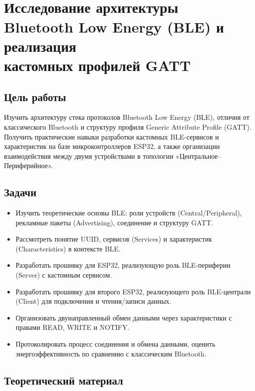 \section[Исследование архитектуры Bluetooth Low Energy (BLE) и реализация кастомных профилей GATT]
{\\Исследование архитектуры Bluetooth Low Energy (BLE) и реализация \\ кастомных профилей GATT}


\subsection{Цель работы}
Изучить архитектуру стека протоколов Bluetooth Low Energy (BLE), отличия от классического Bluetooth и структуру профиля Generic Attribute Profile (GATT). Получить практические навыки разработки кастомных BLE-сервисов и характеристик на базе микроконтроллеров ESP32, а также организации взаимодействия между двумя устройствами в топологии «Центральное–Периферийное».

\subsection{Задачи}
\begin{itemize}[nosep]
    \item Изучить теоретические основы BLE: роли устройств (Central/Peripheral), рекламные пакеты (Advertising), соединение и структуру GATT.
    \item Рассмотреть понятие UUID, сервисов (Services) и характеристик (Characteristics) в контексте BLE.
    \item Разработать прошивку для ESP32, реализующую роль BLE-периферии (Server) с кастомным сервисом.
    \item Разработать прошивку для второго ESP32, реализующего роль BLE-централи (Client) для подключения и чтения/записи данных.
    \item Организовать двунаправленный обмен данными через характеристики с правами READ, WRITE и NOTIFY.
    \item Протоколировать процесс соединения и обмена данными, оценить энергоэффективность по сравнению с классическим Bluetooth.
\end{itemize}

\subsection{Теоретический материал}

